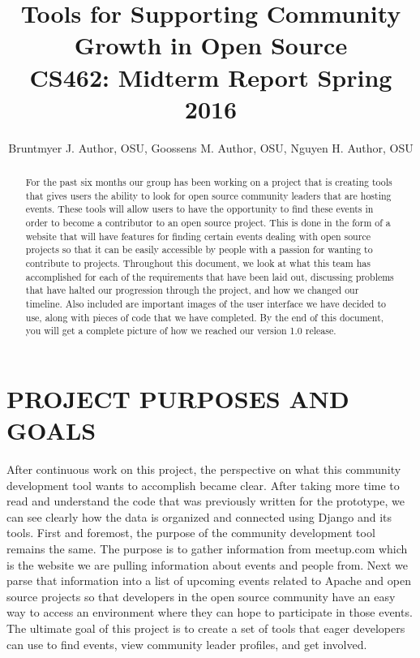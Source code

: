 \documentclass[draftclsnofoot,10pt,onecolumn]{IEEEtran} %
\begin{document}

\title{Tools for Supporting Community Growth in Open Source \\ {\large CS462: Midterm Report Spring 2016}}

\author{Bruntmyer J. Author, OSU, Goossens M. Author, OSU, Nguyen H. Author, OSU}



\maketitle
\begin{abstract}
For the past six months our group has been working on a project that is creating tools that
gives users the ability to look for open source community leaders that are
hosting events. These tools will allow
users to have the opportunity to find these events in order to become a
contributor to an open source project. This is done in the form of a website that
will have features for finding certain events dealing with open source projects
so that it can be easily accessible by people with a passion for wanting to
contribute to projects. Throughout this document, we look at what this team has
accomplished for each of the requirements that have been laid out, discussing problems
that have halted our progression through the project, and how we changed our timeline.
Also included are important images of the user interface we have decided
to use, along with pieces of code that we have completed. By the end of this document, 
you will get a complete picture of how we
reached our version 1.0 release.
\end{abstract}

\newpage


\section{PROJECT PURPOSES AND GOALS}
After continuous work on this project, the perspective on what
this community development tool wants to accomplish became clear. After taking
more time to read and understand the code that was previously written for the
prototype, we can see clearly how the data is organized and connected
using Django and its tools. First and foremost, the purpose of the community
development tool remains the same. The purpose is to gather information from
meetup.com which is the website we are pulling information about events and people from.
Next we parse that information into a list of upcoming events related to
Apache and open source projects so that developers in the open source community
have an easy way to access an environment where they can hope to participate in those
events. The ultimate goal of this project is to create a set of tools that eager developers
can use to find events, view community leader profiles, and get involved.
\end{document}

